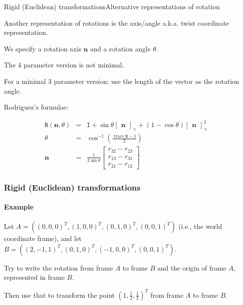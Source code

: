 \documentclass[aspectratio=169]{beamer}
\renewcommand{\vec}[1]{\boldsymbol{#1}}
\newcommand{\mat}[1]{\mathtt{#1}}
\newcommand{\crossmat}[1]{\begin{bmatrix} #1 \end{bmatrix}_{\times}}
\DeclareMathOperator*{\trace}{trace}
\begin{document}
\begin{frame}{Rigid (Euclidean) transformations}{Alternative representations of rotation}

Another representation of rotations is the \alert{axis/angle} a.k.a.
\alert{twist coordinate} representation.

\medskip

We specify a \alert{rotation axis} $\vec{n}$ and a \alert{rotation angle}
$\theta$.

\medskip

The 4 parameter version is not minimal.

\medskip

For a minimal 3 parameter version: use the length of the vector as
the rotation angle.

\medskip

Rodriguez's formulae:

\vspace{-0.2in}

\begin{eqnarray*}
\mat{R}(\vec{n},\theta) & = & \mat{I} + \sin\theta\crossmat{\vec{n}}
  + (1-\cos\theta)\crossmat{\vec{n}}^2 \\
\theta & = & \cos^{-1}\left(\frac{\trace{\mat{R}} - 1}{2}\right) \\
\vec{n} & = & \frac{1}{2\sin\theta}\begin{bmatrix}
r_{32}-r_{23}\\ r_{13} - r_{31} \\ r_{21}-r_{12} \end{bmatrix}
\end{eqnarray*}

\end{frame}


\begin{frame}
\frametitle{Rigid (Euclidean) transformations}
\framesubtitle{Example}

Let $A = ( (0,0,0)^T, (1,0,0)^T, (0,1,0)^T, (0,0,1)^T)$ (i.e., the
world coordinate frame), and let
$B = ( (2,-1,1)^T, (0,1,0)^T, (-1,0,0)^T, (0,0,1)^T)$.

\medskip

Try to write the rotation from frame $A$ to frame $B$ and the origin
of frame $A$, represented in frame $B$.

\medskip

Then use that to transform the point $(1,\frac{1}{2},\frac{1}{2})^T$
from frame $A$ to frame $B$.

\end{frame}
\end{document}
